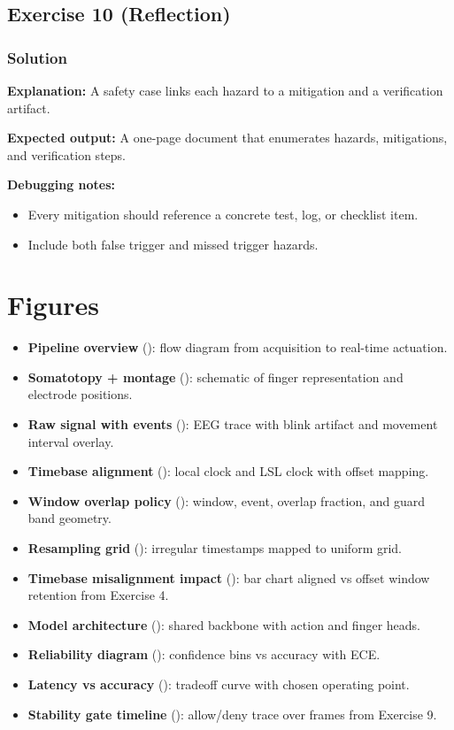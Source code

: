 \documentclass[11pt,openany]{book}
\newcommand{\solution}[1]{%
\subsection*{Solution}
#1
}
\begin{document}
\section{Exercise 10 (Reflection)}
\solution{
\textbf{Explanation:} A safety case links each hazard to a mitigation and a verification artifact.

\textbf{Expected output:} A one-page document that enumerates hazards, mitigations, and verification steps.

\textbf{Debugging notes:}
\begin{itemize}
\item Every mitigation should reference a concrete test, log, or checklist item.
\item Include both false trigger and missed trigger hazards.
\end{itemize}
}

\chapter{Figures}

\begin{itemize}
\item \textbf{Pipeline overview} (\texttt{}): flow diagram from acquisition to real-time actuation.
\item \textbf{Somatotopy + montage} (\texttt{}): schematic of finger representation and electrode positions.
\item \textbf{Raw signal with events} (\texttt{}): EEG trace with blink artifact and movement interval overlay.
\item \textbf{Timebase alignment} (\texttt{}): local clock and LSL clock with offset mapping.
\item \textbf{Window overlap policy} (\texttt{}): window, event, overlap fraction, and guard band geometry.
\item \textbf{Resampling grid} (\texttt{}): irregular timestamps mapped to uniform grid.
\item \textbf{Timebase misalignment impact} (\texttt{}): bar chart aligned vs offset window retention from Exercise 4.
\item \textbf{Model architecture} (\texttt{}): shared backbone with action and finger heads.
\item \textbf{Reliability diagram} (\texttt{}): confidence bins vs accuracy with ECE.
\item \textbf{Latency vs accuracy} (\texttt{}): tradeoff curve with chosen operating point.
\item \textbf{Stability gate timeline} (\texttt{}): allow/deny trace over frames from Exercise 9.
\end{itemize}
\end{document}

